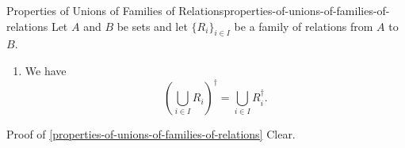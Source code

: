 \begin{proposition}{Properties of Unions of Families of Relations}{properties-of-unions-of-families-of-relations}%
    Let $A$ and $B$ be sets and let $\{R_{i}\}_{i\in I}$ be a family of relations from $A$ to $B$.
    \begin{enumerate}
        \item\label{properties-of-unions-of-families-of-relations-interaction-with-inverses}We have
            \[
                (\bigcup_{i\in I}R_{i})^{\dagger}
                =
                \bigcup_{i\in I}R^{\dagger}_{i}.
            \]%
    \end{enumerate}
\end{proposition}
\begin{Proof}{Proof of \cref{properties-of-unions-of-families-of-relations}}%
    Clear.
\end{Proof}
